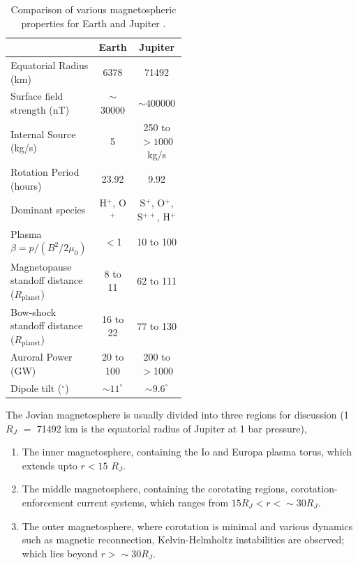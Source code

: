 \begin{table}
    \centering
    \begin{tabular}{p{0.5\linewidth}|c|c}
        &\textbf{Earth}  &\textbf{Jupiter}\\
    \hline
    Equatorial Radius (km) &6378    &71492\\
    Surface field strength (nT)  &$\sim$30000   &$\sim400000$\\
    Internal Source (kg/s)          &5   &250 to $>1000$ kg/s\\
    Rotation Period (hours)         &23.92   &9.92\\
    Dominant species                &H$^+$, O$^+$   &S$^+$, O$^+$, S$^{++}$, H$^+$\\
    Plasma $\beta=p/(B^2/2\mu_0)$   &$<$1 &10 to 100\\
    Magnetopause standoff distance ($R_\text{planet}$)    &8 to 11   &62 to 111\\
    Bow-shock standoff distance ($R_\text{planet}$)   &16 to 22  &77 to 130\\
    Auroral Power (GW)              &20 to 100   &200 to $>$1000\\
    Dipole tilt ($^\circ$)  &$\sim11^\circ$   &$\sim9.6^\circ$\\
    \end{tabular}
    \caption{Comparison of various magnetospheric properties for Earth and Jupiter \protect\cite{Shue1998MagnetopauseConditions,Cairns1996MagneticShock,Khurana2004a, Krupp2004DynamicsMagnetosphere,Clarke2009,Krupp2016ComparisonMagnetospheres,Bagenal2013PlanetaryMagnetospheres}.}
    \label{tab:earth-jupiter-scales}
\end{table}

The Jovian magnetosphere is usually divided into three regions for discussion (1 $R_J$ $=$ 71492 km is the equatorial radius of Jupiter at 1 bar pressure), 

\begin{enumerate}
    \item The inner magnetosphere, containing the Io and Europa plasma torus, which extends upto $r < 15$ $R_J$.
    \item The middle magnetosphere, containing the corotating regions, corotation-enforcement current systems, which ranges from $15 R_J < r < \sim30 R_J$.
    \item The outer magnetosphere, where corotation is minimal and various dynamics such as magnetic reconnection, Kelvin-Helmholtz instabilities are observed; which lies beyond $r > \sim30 R_J$. 
\end{enumerate}

